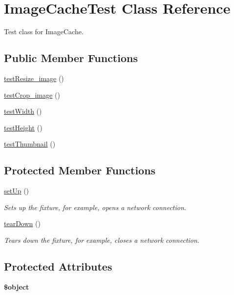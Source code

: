\hypertarget{class_image_cache_test}{
\section{ImageCacheTest Class Reference}
\label{class_image_cache_test}
}


Test class for ImageCache.  


\subsection*{Public Member Functions}
\begin{DoxyCompactItemize}
\item 
\hyperlink{class_image_cache_test_a3b29e68c935765e8bbdb5dc8824ce470}{testResize\_\-image} ()
\item 
\hyperlink{class_image_cache_test_abe21656f10de263f7a38c3085aa76a9d}{testCrop\_\-image} ()
\item 
\hyperlink{class_image_cache_test_a52c55660c2d928d1d067610256339c85}{testWidth} ()
\item 
\hyperlink{class_image_cache_test_ad4b4bc3e0a6e6f2b76d5319af45cfa04}{testHeight} ()
\item 
\hyperlink{class_image_cache_test_aed121d2946fb8b0250eb694f10e259ab}{testThumbnail} ()
\end{DoxyCompactItemize}
\subsection*{Protected Member Functions}
\begin{DoxyCompactItemize}
\item 
\hyperlink{class_image_cache_test_a1c1d8dcbd5e9fd89320159eb5dfb82e5}{setUp} ()
\begin{DoxyCompactList}\small\item\em Sets up the fixture, for example, opens a network connection. \item\end{DoxyCompactList}\item 
\hyperlink{class_image_cache_test_a709986f75057e5776981c9f0468ec470}{tearDown} ()
\begin{DoxyCompactList}\small\item\em Tears down the fixture, for example, closes a network connection. \item\end{DoxyCompactList}\end{DoxyCompactItemize}
\subsection*{Protected Attributes}
\begin{DoxyCompactItemize}
\item 
\hypertarget{class_image_cache_test_a36cb8cf6825ab9edfd0f517e1c166dd5}{
{\bfseries \$object}}
\label{class_image_cache_test_a36cb8cf6825ab9edfd0f517e1c166dd5}

\end{DoxyCompactItemize}


